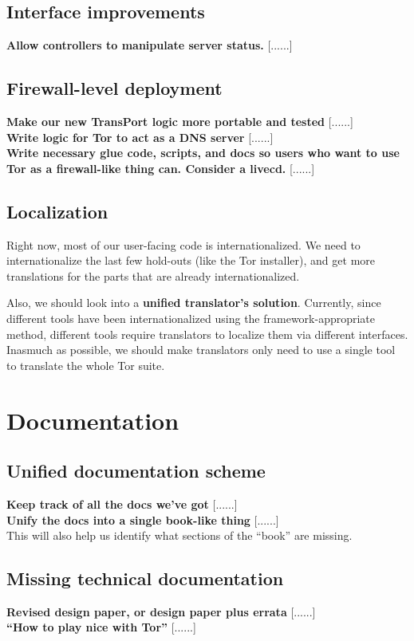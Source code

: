 \documentclass{article}
\newcommand{\tmp}[1]{{\bf #1} [......] \\}
\begin{document}
\subsection{Interface improvements}
\tmp{Allow controllers to manipulate server status.}

\subsection{Firewall-level deployment}
\tmp{Make our new TransPort logic more portable and tested}

\tmp{Write logic for Tor to act as a DNS server}

\tmp{Write necessary glue code, scripts, and docs so users who want to use
  Tor as a firewall-like thing can.  Consider a livecd.}

\subsection{Localization}
Right now, most of our user-facing code is internationalized.  We need to
internationalize the last few hold-outs (like the Tor installer), and get
more translations for the parts that are already internationalized.

Also, we should look into a {\bf unified translator's solution}.  Currently,
since different tools have been internationalized using the
framework-appropriate method, different tools require translators to localize
them via different interfaces.  Inasmuch as possible, we should make
translators only need to use a single tool to translate the whole Tor suite.

\section{Documentation}

\subsection{Unified documentation scheme}

\tmp{Keep track of all the docs we've got}

\tmp{Unify the docs into a single book-like thing}  This will also help us
identify what sections of the ``book'' are missing.

\subsection{Missing technical documentation}

\tmp{Revised design paper, or design paper plus errata}

\tmp{``How to play nice with Tor''}
\end{document}
